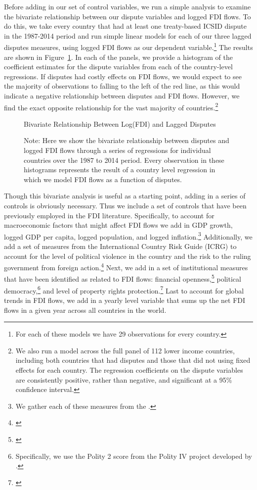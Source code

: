 \documentclass[12pt,onesided]{amsart}
\begin{document}
Before adding in our set of control variables, we run a simple analysis to examine the bivariate relationship between our dispute variables and logged FDI flows. To do this, we take every country that had at least one treaty-based ICSID dispute in the 1987-2014 period and run simple linear models for each of our three lagged disputes measures, using logged FDI flows as our dependent variable.\footnote{For each of these models we have 29 observations for every country.} The results are shown in Figure~\ref{fig:corrFDI}. In each of the panels, we provide a histogram of the coefficient estimates for the dispute variables from each of the country-level regressions. If disputes had costly effects on FDI flows, we would expect to see the majority of observations to falling to the left of the red line, as this would indicate a negative relationship between disputes and FDI flows. However, we find the exact opposite relationship for the vast majority of countries.\footnote{We also run a model across the full panel of 112 lower income countries, including both countries that had disputes and those that did not using fixed effects for each country. The regression coefficients on the dispute variables are consistently positive, rather than negative, and significant at a 95\% confidence interval.}

\begin{figure}[ht]
	\centering
	\caption{Bivariate Relationship Between Log(FDI) and Lagged Disputes}
	\label{fig:corrFDI}
	\resizebox{1\textwidth}{!}{}	
	\caption*{Note: Here we show the bivariate relationship between disputes and logged FDI flows through a series of regressions for individual countries over the 1987 to 2014 period. Every observation in these histograms represents the result of a country level regression in which we model FDI flows as a function of disputes.}
\end{figure}
\FloatBarrier

Though this bivariate analysis is useful as a starting point, adding in a series of controls is obviously necessary. Thus we include a set of controls that have been previously employed in the FDI literature. Specifically, to account for macroeconomic factors that might affect FDI flows we add in GDP growth, logged GDP per capita, logged population, and logged inflation.\footnote{We gather each of these measures from the \citet{worldbank:2013}.} Additionally, we add a set of measures from the International Country Risk Guide (ICRG) to account for the level of political violence in the country and the risk to the ruling government from foreign action.\footnote{\citet{prs:2013}} Next, we add in a set of institutional measures that have been identified as related to FDI flows: financial openness,\footnote{\citet{chinn:ito:2008}} political democracy,\footnote{Specifically, we use the Polity 2 score from the Polity IV project developed by \citet{marshall2013polity}.} and level of property rights protection.\footnote{\citet{prs:2013}} Last to account for global trends in FDI flows, we add in a yearly level variable that sums up the net FDI flows in a given year across all countries in the world.
\end{document}
